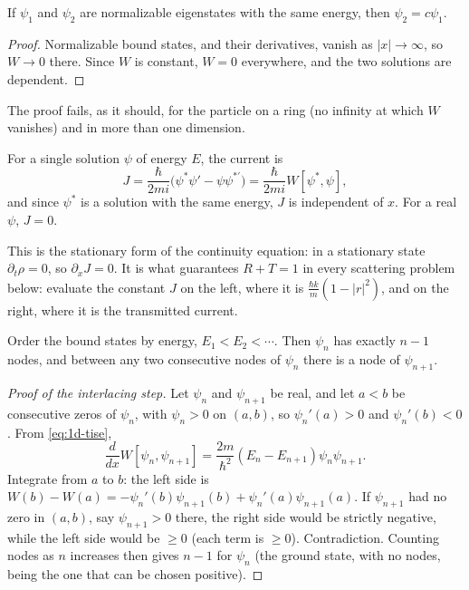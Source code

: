 \begin{theorem}
If $\psi_1$ and $\psi_2$ are normalizable eigenstates with the same energy, then $\psi_2 = c\psi_1$.
\end{theorem}
\begin{proof}
Normalizable bound states, and their derivatives, vanish as $|x|\to\infty$, so $W\to0$ there. Since $W$ is constant, $W = 0$ everywhere, and the two solutions are dependent.
\end{proof}

The proof fails, as it should, for the particle on a ring (no infinity at which $W$ vanishes) and in more than one dimension.

\begin{theorem}
For a single solution $\psi$ of energy $E$, the current is
\[
    J = \frac{\hbar}{2mi}\bigl(\psi^*\psi' - \psi\psi^{*\prime}\bigr) = \frac{\hbar}{2mi}W[\psi^*,\psi],
\]
and since $\psi^*$ is a solution with the same energy, $J$ is independent of $x$. For a real $\psi$, $J = 0$.
\end{theorem}

This is the stationary form of the continuity equation: in a stationary state $\partial_t\rho = 0$, so $\partial_xJ = 0$. It is what guarantees $R + T = 1$ in every scattering problem below: evaluate the constant $J$ on the left, where it is $\frac{\hbar k}{m}(1 - |r|^2)$, and on the right, where it is the transmitted current.

\begin{theorem}
Order the bound states by energy, $E_1<E_2<\cdots$. Then $\psi_n$ has exactly $n-1$ nodes, and between any two consecutive nodes of $\psi_n$ there is a node of $\psi_{n+1}$.
\end{theorem}
\begin{proof}[Proof of the interlacing step]
Let $\psi_n$ and $\psi_{n+1}$ be real, and let $a<b$ be consecutive zeros of $\psi_n$, with $\psi_n>0$ on $(a,b)$, so $\psi_n'(a)>0$ and $\psi_n'(b)<0$. From \eqref{eq:1d-tise},
\[
    \frac{d}{dx}W[\psi_n,\psi_{n+1}] = \frac{2m}{\hbar^2}(E_n - E_{n+1})\psi_n\psi_{n+1}.
\]
Integrate from $a$ to $b$: the left side is $W(b) - W(a) = -\psi_n'(b)\psi_{n+1}(b) + \psi_n'(a)\psi_{n+1}(a)$. If $\psi_{n+1}$ had no zero in $(a,b)$, say $\psi_{n+1}>0$ there, the right side would be strictly negative, while the left side would be $\ge0$ (each term is $\ge0$). Contradiction. Counting nodes as $n$ increases then gives $n-1$ for $\psi_n$ (the ground state, with no nodes, being the one that can be chosen positive).
\end{proof}

